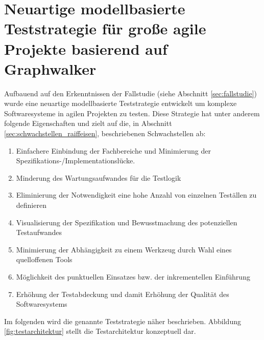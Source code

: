 \chapter{Neuartige modellbasierte Teststrategie für große agile Projekte basierend auf Graphwalker}
\label{sec:results}

Aufbauend auf den Erkenntnissen der Fallstudie (siehe Abschnitt \ref{sec:fallstudie}) wurde eine neuartige modellbasierte Teststrategie entwickelt um komplexe Softwaresysteme in agilen Projekten zu testen. Diese Strategie hat unter anderem folgende Eigenschaften und zielt auf die, in Abschnitt \ref{sec:schwachstellen_raiffeisen}, beschriebenen Schwachstellen ab:

\begin{enumerate}
\item Einfachere Einbindung der Fachbereiche und Minimierung der Spezifikations-/Implementationslücke.
\item Minderung des Wartungsaufwandes für die Testlogik
\item Eliminierung der Notwendigkeit eine hohe Anzahl von einzelnen Teställen zu definieren
\item Visualisierung der Spezifikation und Bewusstmachung des potenziellen Testaufwandes
\item Minimierung der Abhängigkeit zu einem Werkzeug durch Wahl eines quelloffenen Tools
\item Möglichkeit des punktuellen Einsatzes bzw. der inkrementellen Einführung
\item Erhöhung der Testabdeckung und damit Erhöhung der Qualität des Softwaresystems
\end{enumerate}

Im folgenden wird die genannte Teststrategie näher beschrieben. Abbildung \ref{fig:testarchitektur} stellt die Testarchitektur konzeptuell dar.

